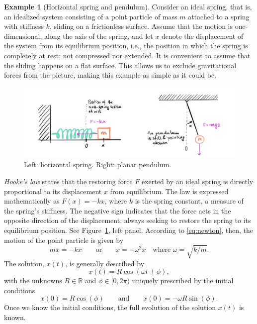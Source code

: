 \documentclass[english,fontsize=11pt,paper=b5]{scrbook}
\theoremstyle{definition}
\newtheorem{example}{Example}[chapter]
\begin{document}
  \begin{example}[Horizontal spring and pendulum]\label{ex:sprPen}
    Consider an ideal spring, that is, an idealized system consisting of a point particle of mass $m$ attached to a spring with stiffness $k$, sliding on a frictionless surface.
    Assume that the motion is one-dimensional, along the axis of the spring, and let $x$ denote the displacement of the system from its equilibrium position, i.e., the position in which the spring is completely at rest: not compressed nor extended.
    It is convenient to assume that the sliding happens on a flat surface.
    This allows us to exclude gravitational forces from the picture, making this example as simple as it could be.

    \begin{figure}[ht!]
      \centering
      \includegraphics[width=\linewidth]{images/HM-1-2.pdf}
      \caption{Left: horizontal spring. Right: planar pendulum.}%
      \label{fig:spring-pendulum}
    \end{figure}

    \emph{Hooke's law}  states that the restoring force $F$ exerted by an ideal spring is directly proportional to its displacement $x$ from equilibrium.
    The law is expressed mathematically as $F(x) = -kx$, where $k$ is the spring constant, a measure of the spring's stiffness.
    The negative sign indicates that the force acts in the opposite direction of the displacement, always seeking to restore the spring to its equilibrium position. See Figure~\ref{fig:spring-pendulum}, left panel.
    According to \eqref{eq:newton}, then, the motion of the point particle is given by
    \begin{equation}\label{eq:spring}
      m \ddot{x} = - k x \qquad\mbox{or}\qquad \ddot{x} = - \omega^2 x \quad\mbox{where } \omega = \sqrt{k/m}.
    \end{equation}
    The solution, $x(t)$, is generally described by
    \begin{equation}\label{eq:springsol}
      x(t) = R \cos(\omega t + \phi),
    \end{equation} with the unknowns $R\in\mathbb{R}$ and $\phi\in[0,2\pi)$ uniquely prescribed by the initial conditions
    \begin{equation}
      x(0) = R\cos(\phi) \qquad\mbox{and}\qquad \dot x(0) = -\omega R \sin(\phi).
    \end{equation}
    Once we know the initial conditions, the full evolution of the solution $x(t)$ is known.
    \medskip


\end{example}
\end{document}
